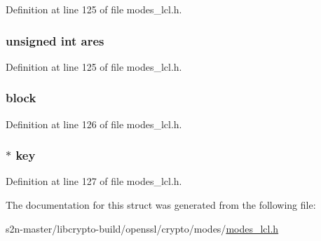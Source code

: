 Definition at line 125 of file modes\+\_\+lcl.\+h.

\subsubsection[{\texorpdfstring{ares}{ares}}]{\setlength{\rightskip}{0pt plus 5cm}unsigned int ares}\hypertarget{structgcm128__context_a88b64631b422e7f0d512a6c6b66be004}{}\label{structgcm128__context_a88b64631b422e7f0d512a6c6b66be004}


Definition at line 125 of file modes\+\_\+lcl.\+h.

\subsubsection[{\texorpdfstring{block}{block}}]{ block}\hypertarget{structgcm128__context_a59f10af1cb28ada84b1535c0270f51e4}{}\label{structgcm128__context_a59f10af1cb28ada84b1535c0270f51e4}


Definition at line 126 of file modes\+\_\+lcl.\+h.

\subsubsection[{\texorpdfstring{key}{key}}]{$\ast$ key}\hypertarget{structgcm128__context_ab5c000aec752f2206131e183daf5efbf}{}\label{structgcm128__context_ab5c000aec752f2206131e183daf5efbf}


Definition at line 127 of file modes\+\_\+lcl.\+h.



The documentation for this struct was generated from the following file\+:\begin{DoxyCompactItemize}
\item 
s2n-\/master/libcrypto-\/build/openssl/crypto/modes/\hyperlink{modes__lcl_8h}{modes\+\_\+lcl.\+h}\end{DoxyCompactItemize}
